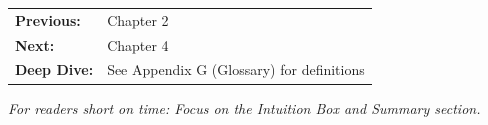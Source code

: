 \begin{tcolorbox}[
    colback=green!5!white,
    colframe=green!75!black,
    title={\textbf{Reading Path}},
    fonttitle=\bfseries
]
\begin{tabular}{@{}ll@{}}
\textbf{Previous:} & Chapter 2 \\
\textbf{Next:} & Chapter 4 \\
\textbf{Deep Dive:} & See Appendix G (Glossary) for definitions \\
\end{tabular}

\medskip
\textit{For readers short on time: Focus on the Intuition Box and Summary section.}
\end{tcolorbox}

